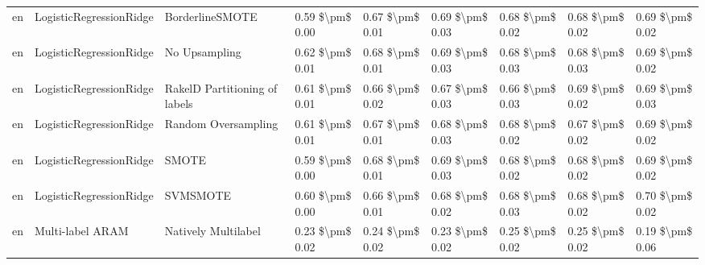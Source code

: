 \begin{tabular}{lllllllll}
      en &         LogisticRegressionRidge &               BorderlineSMOTE & 0.59 \$\textbackslash pm\$ 0.00 &           0.67 \$\textbackslash pm\$ 0.01 &       0.69 \$\textbackslash pm\$ 0.03 &        0.68 \$\textbackslash pm\$ 0.02 &                         0.68 \$\textbackslash pm\$ 0.02 &     0.69 \$\textbackslash pm\$ 0.02 \\
      en &         LogisticRegressionRidge &                 No Upsampling & 0.62 \$\textbackslash pm\$ 0.01 &           0.68 \$\textbackslash pm\$ 0.01 &       0.69 \$\textbackslash pm\$ 0.03 &        0.68 \$\textbackslash pm\$ 0.03 &                         0.68 \$\textbackslash pm\$ 0.03 &     0.69 \$\textbackslash pm\$ 0.02 \\
      en &         LogisticRegressionRidge & RakelD Partitioning of labels & 0.61 \$\textbackslash pm\$ 0.01 &           0.66 \$\textbackslash pm\$ 0.02 &       0.67 \$\textbackslash pm\$ 0.03 &        0.66 \$\textbackslash pm\$ 0.03 &                         0.69 \$\textbackslash pm\$ 0.02 &     0.69 \$\textbackslash pm\$ 0.03 \\
      en &         LogisticRegressionRidge &           Random Oversampling & 0.61 \$\textbackslash pm\$ 0.01 &           0.67 \$\textbackslash pm\$ 0.01 &       0.68 \$\textbackslash pm\$ 0.03 &        0.68 \$\textbackslash pm\$ 0.02 &                         0.67 \$\textbackslash pm\$ 0.02 &     0.69 \$\textbackslash pm\$ 0.02 \\
      en &         LogisticRegressionRidge &                         SMOTE & 0.59 \$\textbackslash pm\$ 0.00 &           0.68 \$\textbackslash pm\$ 0.01 &       0.69 \$\textbackslash pm\$ 0.03 &        0.68 \$\textbackslash pm\$ 0.02 &                         0.68 \$\textbackslash pm\$ 0.02 &     0.69 \$\textbackslash pm\$ 0.02 \\
      en &         LogisticRegressionRidge &                      SVMSMOTE & 0.60 \$\textbackslash pm\$ 0.00 &           0.66 \$\textbackslash pm\$ 0.01 &       0.68 \$\textbackslash pm\$ 0.02 &        0.68 \$\textbackslash pm\$ 0.03 &                         0.68 \$\textbackslash pm\$ 0.02 &     0.70 \$\textbackslash pm\$ 0.02 \\
      en &                Multi-label ARAM &           Natively Multilabel & 0.23 \$\textbackslash pm\$ 0.02 &           0.24 \$\textbackslash pm\$ 0.02 &       0.23 \$\textbackslash pm\$ 0.02 &        0.25 \$\textbackslash pm\$ 0.02 &                         0.25 \$\textbackslash pm\$ 0.02 &     0.19 \$\textbackslash pm\$ 0.06 \\

\end{tabular}
